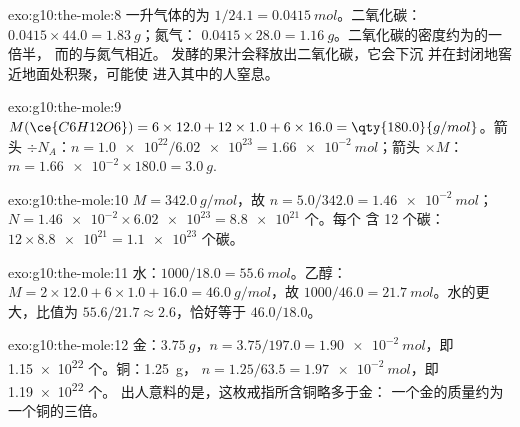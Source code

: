 \begin{solution}{exo:g10:the-mole:8}
一升气体的为 $1/24.1 = \qty{0.0415}{mol}$。二氧化碳：
$0.0415 \times 44.0 = \qty{1.83}{g}$；氮气：
$0.0415 \times 28.0 = \qty{1.16}{g}$。二氧化碳的密度约为的一倍半，
而的与氮气相近。
发酵的果汁会释放出二氧化碳，它会下沉
并在封闭地窖近地面处积聚，可能使
进入其中的人窒息。
\end{solution}

\begin{solution}{exo:g10:the-mole:9}
$M(\ce{C6H12O6}) = 6 \times 12.0 + 12 \times 1.0 + 6 \times 16.0 =
\qty{180.0}{g/mol}$。箭头 $\div N_A$：$n = \num{1.0e22} / \num{6.02e23} =
\qty{1.66e-2}{mol}$；箭头 $\times M$：$m = \num{1.66e-2} \times 180.0 =
\qty{3.0}{g}$.
\end{solution}

\begin{solution}{exo:g10:the-mole:10}
$M = \qty{342.0}{g/mol}$，故 $n = 5.0 / 342.0 = \qty{1.46e-2}{mol}$；
$N = \num{1.46e-2} \times \num{6.02e23} = \num{8.8e21}$ 个。每个
含 12 个碳：$12 \times \num{8.8e21} = \num{1.1e23}$ 个碳。
\end{solution}

\begin{solution}{exo:g10:the-mole:11}
水：$1000 / 18.0 = \qty{55.6}{mol}$。乙醇：
$M = 2 \times 12.0 + 6 \times 1.0 + 16.0 = \qty{46.0}{g/mol}$，故
$1000 / 46.0 = \qty{21.7}{mol}$。水的更大，比值为
$55.6 / 21.7 \approx 2.6$，恰好等于 $46.0 / 18.0$。
\end{solution}

\begin{solution}{exo:g10:the-mole:12}
金：$\qty{3.75}{g}$，$n = 3.75 / 197.0 = \qty{1.90e-2}{mol}$，即
\num{1.15e22} 个。铜：\qty{1.25}{g}，
$n = 1.25 / 63.5 = \qty{1.97e-2}{mol}$，即 \num{1.19e22} 个。
出人意料的是，这枚戒指所含铜略多于金：
一个金的质量约为一个铜的三倍。
\end{solution}

